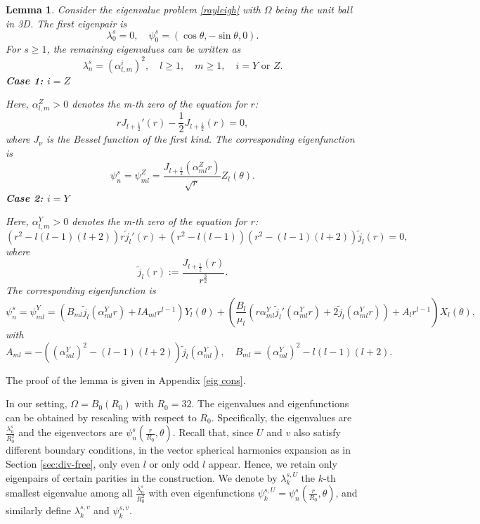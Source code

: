 \documentclass[11pt,a4paper]{article}
\numberwithin{equation}{section}
\newcommand{\assign}{:=}
\newcommand{\infixor}{\text{ or }}
\newcommand{\tmstrong}[1]{\textbf{#1}}
\newtheorem{lemma}{Lemma}
\begin{document}
\begin{lemma}
  \label{lem:lap eig}Consider the eigenvalue problem \eqref{rayleigh} with
  $\Omega$ being the unit ball in 3D. The first eigenpair is
  \[ \lambda_0^s = 0, \quad \psi_0^s = (\cos \theta, - \sin \theta, 0) . \]
  For $s \geqslant 1$, the remaining eigenvalues can be written as
  \[ \lambda_n^s = (\alpha_{l, m}^i)^2, \quad l \geqslant 1, \quad m \geqslant
     1, \quad i = Y \infixor Z. \]
  {\tmstrong{Case 1: $i = Z$}}
  
  Here, $\alpha_{l, m}^Z > 0$ denotes the m-th zero of the equation for $r$:
  \begin{equation}
    rJ_{l + \frac{1}{2}}' (r) - \frac{1}{2} J_{l + \frac{1}{2}} (r) = 0,
    \label{eq:alphaZ}
  \end{equation}
  where $J_{\nu}$ is the Bessel function of the first kind. The corresponding
  eigenfunction is
  \[ \psi_n^s = \psi_{ml}^Z = \frac{J_{l + \frac{1}{2}}  (\alpha^Z_{ml}
     r)}{\sqrt{r}} Z_l (\theta) . \]
  {\tmstrong{Case 2: $i = Y$}}
  
  Here, $\alpha_{l, m}^Y > 0$ denotes the m-th zero of the equation for $r$:
  \begin{equation}
    (r^2 - l (l - 1) (l + 2)) r \tilde{j}_l' (r) + (r^2 - l (l - 1))  (r^2 -
    (l - 1) (l + 2))  \tilde{j}_l (r) = 0, \label{eq:alphaY}
  \end{equation}
  where
  \[ \tilde{j}_l (r) \assign \frac{J_{l + \frac{1}{2}} (r)}{r^{\frac{3}{2}}} .
  \]
  The corresponding eigenfunction is
  \[ \psi_n^s = \psi_{ml}^Y = (B_{ml}  \tilde{j}_l (\alpha^Y_{ml} r) + lA_{ml}
     r^{l - 1}) Y_l (\theta) + \left( \frac{B_l}{\mu_l} (r \alpha^Y_{ml} 
     \tilde{j}_l' (\alpha^Y_{ml} r) + 2 \tilde{j}_l (\alpha^Y_{ml} r)) + A_l
     r^{l - 1} \right) X_l (\theta), \]
  with
  \[ A_{ml} = - ((\alpha^Y_{ml})^2 - (l - 1) (l + 2))  \tilde{j}_l
     (\alpha^Y_{ml}), \quad B_{ml} = (\alpha^Y_{ml})^2 - l (l - 1)  (l + 2) .
  \]
\end{lemma}

The proof of the lemma is given in Appendix \ref{eig cons}.

\begin{remark}
  In our setting, $\Omega = B_0 (R_0)$ with $R_0 = 32$. The eigenvalues and
  eigenfunctions can be obtained by rescaling with respect to $R_0$.
  Specifically, the eigenvalues are $\frac{\lambda^s_n}{R_0^2}$ and the
  eigenvectors are $\psi_n^s \left( \frac{r}{R_0}, \theta \right)$. Recall
  that, since $U$ and $v$ also satisfy different boundary conditions, in the
  vector spherical harmonics expansion as in Section \ref{sec:div-free}, only
  even $l$ or only odd $l$ appear. Hence, we retain only eigenpairs of certain
  parities in the construction. We denote by $\lambda_k^{s, U}$ the $k$-th
  smallest eigenvalue among all $\frac{\lambda^s_n}{R_0^2}$ with even
  eigenfunctions $\psi_k^{s, U} = \psi_n^s \left( \frac{r}{R_0}, \theta
  \right)$, and similarly define $\lambda_k^{s, v}$ and $\psi_k^{s, v}$.
\end{remark}
\end{document}
